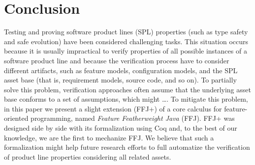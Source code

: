 \section{Conclusion}\label{seq:conclusion}

Testing and proving software product lines (SPL) properties 
(such as type safety and safe evolution) have been 
considered challenging tasks. This situation occurs because   
it is usually impractical to verify properties of all possible 
instances of a software product line and because 
the verification process have to consider different artifacts, 
such as feature models, configuration models, and the SPL asset 
base (that is, requirement models, source code, and so on). 
To partially solve this problem, verification approaches often  
assume that the underlying asset base conforms to a set 
of assumptions{\color{red}, which might \ldots}. To mitigate this problem, in this paper we 
present a slight extension (\ac{FFJ+}) of a core 
calculus for feature-oriented programming, named 
\emph{Feature Featherweight Java} (\ac{FFJ}). \ac{FFJ+} was designed 
side by side with its formalization using Coq and, to the best 
of our knowledge, we are the first to mechanize \ac{FFJ}.  
We believe that such a formalization might help future research efforts 
to full automatize the verification of product line properties 
considering all related assets.


